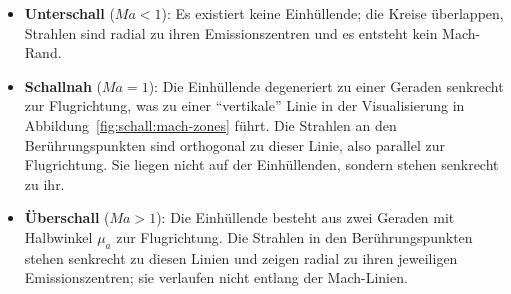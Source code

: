 \begin{itemize}
\item \textbf{Unterschall} ($\textit{Ma}<1$):
Es existiert keine Einhüllende; die Kreise überlappen, Strahlen
sind radial zu ihren Emissionszentren und es entsteht kein Mach-Rand.

\item \textbf{Schallnah} ($\textit{Ma}=1$):
Die Einhüllende degeneriert zu einer Geraden senkrecht zur Flugrichtung,
was zu einer ``vertikale'' Linie in der Visualisierung in Abbildung~\ref{fig:schall:mach-zones} führt.
Die Strahlen an den Berührungspunkten sind orthogonal zu dieser Linie,
also parallel zur Flugrichtung.
Sie liegen nicht auf der Einhüllenden, sondern stehen senkrecht zu ihr.

\item \textbf{Überschall} ($\textit{Ma}>1$):
Die Einhüllende besteht aus zwei Geraden mit Halbwinkel $\mu_a$ zur
Flugrichtung.
Die Strahlen in den Berührungspunkten stehen senkrecht zu
diesen Linien und zeigen radial zu ihren jeweiligen Emissionszentren;
sie verlaufen nicht entlang der Mach-Linien.
\end{itemize}

